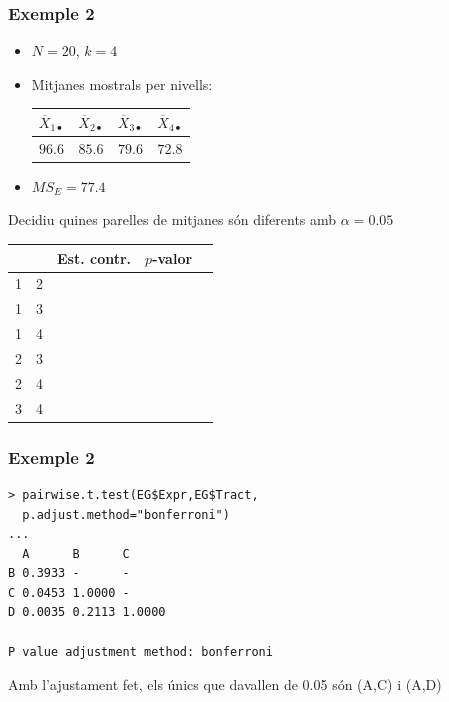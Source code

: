 \documentclass[12pt,t]{beamer}
\theoremstyle{plain}
\theoremstyle{definition}
\begin{document}
\begin{frame}
\frametitle{Exemple 2}
\vspace*{-2ex}

\begin{itemize}
\item $N=20$, $k=4$

\item Mitjanes mostrals per nivells:
\begin{center}
\begin{tabular}{c|c|c|c}
\quad${\overline{X}_{1\bullet}}$\quad{} & \quad${\overline{X}_{2\bullet}}$\quad{} & \quad${\overline{X}_{3\bullet}}$\quad{} & \quad${\overline{X}_{4\bullet}}$\quad{} \\
\hline
$96.6$ &
$85.6$ &
$79.6$ &
$72.8$ 
\end{tabular}
\end{center}

\item $MS_E=77.4$
\end{itemize}

Decidiu quines parelles de mitjanes són diferents amb $\alpha=0.05$

\begin{center}
\begin{tabular}{r|r|r|r|r|}
& & Est. contr. & $p$-valor \\
\hline
1 & 2 & & \\
1 & 3 & & \\
1 & 4 & & \\
2 & 3 & & \\
2 &4 & & \\
3 & 4 & & \\
\end{tabular}
\end{center}

\end{frame}


\begin{frame}[fragile]
\frametitle{Exemple 2}
\vspace*{-3ex}

\begin{verbatim}
> pairwise.t.test(EG$Expr,EG$Tract,
  p.adjust.method="bonferroni")
...
  A      B      C     
B 0.3933 -      -     
C 0.0453 1.0000 -     
D 0.0035 0.2113 1.0000

P value adjustment method: bonferroni 
\end{verbatim}
Amb l'ajustament fet, els únics que davallen de 0.05 són (A,C) i (A,D)

\end{frame}
\end{document}
